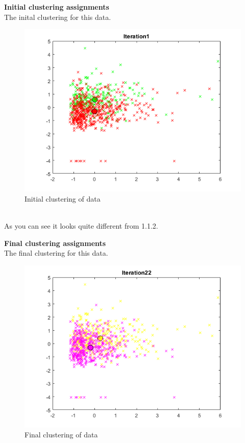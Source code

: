 \documentclass[12pt]{article}
\begin{document}
\newpage
\noindent
\textbf{Initial clustering assignments}
\\[0.1 in]
The inital clustering for this data.
\begin{figure}[h!]
    \begin{center}
        \includegraphics[scale=1.2]{TQ3_1_b.png}
        \caption{Initial clustering of data}
    \end{center}    
\end{figure}
\\
As you can see it looks quite different from 1.1.2.

\newpage
\noindent
\textbf{Final clustering assignments}
\\[0.1 in]
The final clustering for this data.
\begin{figure}[h!]
    \begin{center}
        \includegraphics[scale=1.2]{TQ3_1_c.png}
        \caption{Final clustering of data}
    \end{center}    
\end{figure}
\end{document}
